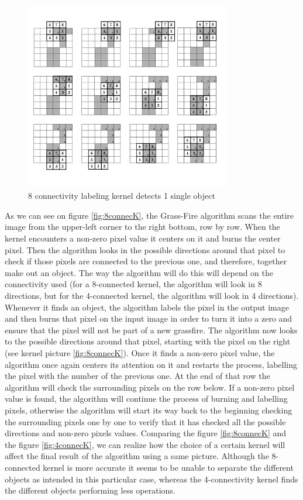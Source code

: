 \begin{figure}[htbp]
\centering
\includegraphics[width=0.8\textwidth]{Pictures/Theory/8connec_kernel.png}
\caption{8 connectivity labeling kernel detects 1 single object}
\label{fig:8connecK}
\end{figure}

As we can see on figure \eqref{fig:8connecK}, the Grass-Fire algorithm scans the entire image from the upper-left corner to the right bottom, row by row. When the kernel encounters a non-zero pixel value it centers on it and burns the center pixel. Then the algorithm looks in the possible directions around that pixel to check if those pixels are connected to the previous one, and therefore, together make out an object. The way the algorithm will do this will depend on the connectivity used (for a 8-connected kernel, the algorithm will look in 8 directions, but for the 4-connected kernel, the algorithm will look in 4 directions).
Whenever it finds an object, the algorithm labels the pixel in the output image and then burns that pixel on the input image in order to turn it into a zero and ensure that the pixel will not be part of a new grassfire.
The algorithm now looks to the possible directions around that pixel, starting with the pixel on the right (see kernel picture \eqref{fig:8connecK}). Once it finds a non-zero pixel value, the algorithm once again centers its attention on it and restarts the process, labelling the pixel with the number of the previous one. At the end of that row the algorithm will check the surrounding pixels on the row below. If a non-zero pixel value is found, the algorithm will continue the process of burning and labelling pixels, otherwise the algorithm will start its way back to the beginning checking the surrounding pixels one by one to verify that it has checked all the possible directions and non-zero pixels values.
Comparing the figure \eqref{fig:8connecK} and the figure \eqref{fig:4connecK}, we can realize how the choice of a certain kernel will affect the final result of the algorithm using a same picture. Although the 8-connected kernel is more accurate it seems to be unable to separate the different objects as intended in this particular case, whereas the 4-connectivity kernel finds the different objects performing less operations.

